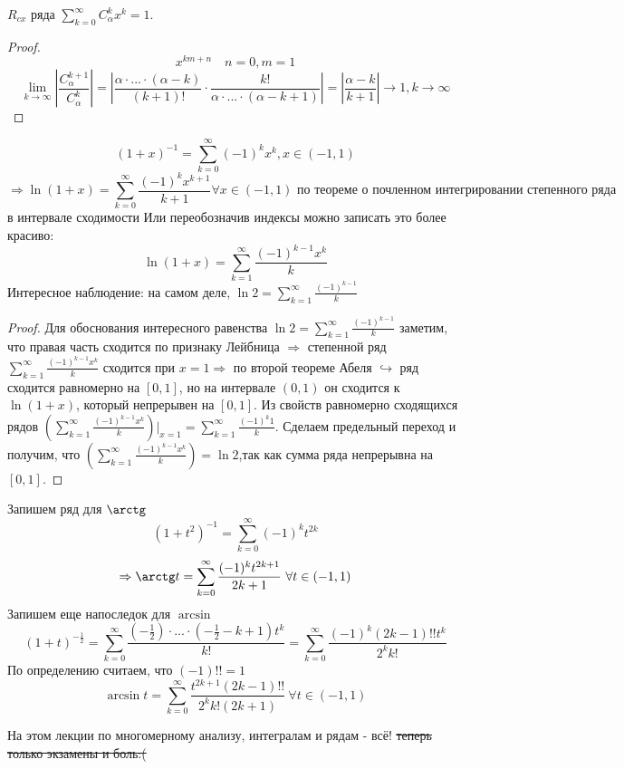 \documentclass[11pt]{article}
\begin{document}
\begin{remark}
    $R_{cx}$ ряда $\displaystyle \sum_{k=0}^{\infty} C_\alpha^k x^k =1 .$
\end{remark}


\begin{proof}
    \[ x^{km+n} \quad n=0, m=1 \]  
    \[ \lim\limits_{k\to \infty} \left| \frac{C_\alpha^{k+1}}{C_\alpha^k} \right| = \left| \frac{\alpha \cdot ... \cdot (\alpha-k)}{(k+1)!} \cdot \frac{k!}{\alpha\cdot ... \cdot(\alpha-k+1)} \right| = \left| \frac{\alpha-k}{k+1}\right| \to 1, k\to \infty \]
\end{proof}


\begin{remark}
    \[ (1+x)^{-1} = \sum_{k=0}^{\infty} (-1)^k x^k, x\in (-1,1) \] 
    \[ \Rightarrow \ln (1+x) = \sum_{k=0}^{\infty} \frac{(-1)^k x^{k+1}}{k+1} \forall x\in (-1,1) \text{ по теореме о почленном интегрировании степенного ряда  } \] 
    в интервале сходимости
    Или переобозначив индексы можно записать это более красиво:
    \[ \ln (1+x) = \sum_{k=1}^{\infty} \frac{(-1)^{k-1}x^k}{k} \]
    Интересное наблюдение: на самом деле, $\displaystyle \ln 2= \sum_{k=1}^{\infty} \frac{(-1)^{k-1}}{k}$
\end{remark}

\begin{proof}
    Для обоснования интересного равенства $\displaystyle \ln 2= \sum_{k=1}^{\infty} \frac{(-1)^{k-1}}{k}$ заметим, что правая часть сходится по признаку Лейбница $\Rightarrow$ степенной ряд $\displaystyle \sum_{k=1}^{\infty} \frac{(-1)^{k-1}x^k}{k}$ сходится при $x=1\Rightarrow$ по второй теореме Абеля $\hookrightarrow$ ряд сходится равномерно на $[0,1]$,
    но на интервале $(0,1)$ он сходится к $\ln (1+x)$, который непрерывен на $[0,1]$. Из свойств равномерно сходящихся рядов $\displaystyle \left( \sum_{k=1}^{\infty} \frac{(-1)^{k-1} x^{k}}{k} \right) \bigg|_{x=1}= \sum_{k=1}^{\infty} \frac{(-1)^k 1}{k}$. Сделаем предельный переход 
    и получим, что $\displaystyle \left( \sum_{k=1}^{\infty} \frac{(-1)^{k-1} x^{k}}{k} \right) = \ln 2$,так как сумма ряда непрерывна на $[0,1]$.
\end{proof}


\begin{remark}
    Запишем ряд для $\arctg$
    \[ (1+t^2)^{-1} = \sum_{k=0}^{\infty} (-1)^k t^{2k} \] 
    \[ \Rightarrow \arctg t = \sum_{k=0}^{\infty} \frac{(-1)^k t^{2k+1}}{2k+1} \ \forall t\in (-1,1) \]   
    Запишем еще напоследок для $\arcsin$
    \[ (1+t)^{-\frac{1}{2}} = \sum_{k=0}^{\infty} \frac{(-\frac{1}{2}) \cdot ... \cdot (-\frac{1}{2} -k+1) t^k }{k!} = \sum_{k=0}^{\infty} \frac{(-1)^k (2k-1)!!t^k}{2^k k!}   \]
    По определению считаем, что $(-1)!! = 1$
    \[ \arcsin t = \sum_{k=0}^{\infty} \frac{ t^{2k+1} (2k-1)!!}{2^k k! (2k+1)} \ \forall t\in (-1,1) \]
\end{remark}

На этом лекции по многомерному анализу, интегралам и рядам - всё! \sout{теперь только экзамены и боль:(}
\end{document}
